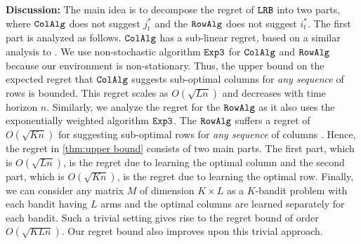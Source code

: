 \textbf{Discussion:} The main idea is to decompose the regret of ${\tt LRB}$ into two parts, where ${\tt ColAlg}$ does not suggest $j^*_t$ and the ${\tt RowAlg}$ does not suggest $i^*_t$. The first part is analyzed as follows. ${\tt ColAlg}$ has a sub-linear regret, based on a similar analysis to \citet{auer2002nonstochastic}. We use non-stochastic algorithm ${\tt Exp3}$ for ${\tt ColAlg}$ and ${\tt RowAlg}$ because our environment is non-stationary. Thus, the upper bound on the expected regret that ${\tt ColAlg}$ suggests sub-optimal columns for \emph{any sequence} of rows is bounded. This regret scales as $O(\sqrt{L n})$ and decreases with time horizon $n$. Similarly, we analyze the regret for the ${\tt RowAlg}$ as it also uses the exponentially weighted algorithm ${\tt Exp3}$. The ${\tt RowAlg}$ suffers a regret of $O(\sqrt{K n})$ for suggesting sub-optimal rows for \emph{any sequence} of columns . Hence, the regret in \cref{thm:upper bound} consists of two main parts. The first part, which is $O(\sqrt{L n})$, is the regret due to learning the optimal column and the second part, which is $O(\sqrt{K n})$, is the regret due to learning the optimal row. Finally, we can consider any matrix $M$ of dimension $K\times L$ as a $K$-bandit problem with each bandit having $L$ arms and the optimal columns are learned separately for each bandit. Such a trivial setting gives rise to the regret bound of order $O(\sqrt{K L n})$. Our regret bound also improves upon this trivial approach.




